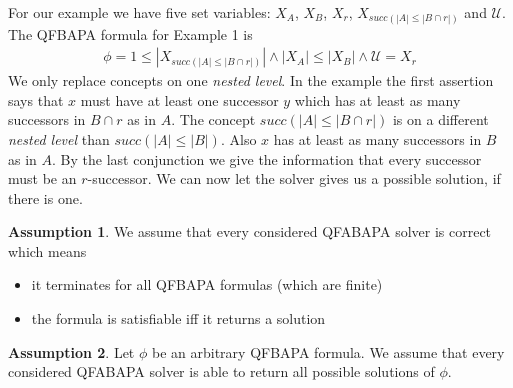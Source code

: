 \documentclass{book}
\theoremstyle{break}
\theoremstyle{definition}
\newtheorem{assumption}{Assumption}
\begin{document}
For our example we have five set variables: $X_A$, $X_B$, $X_r$, $X_{succ(|A|\leq |B\cap r|)}$ and $\mathcal{U}$. The QFBAPA formula for Example 1 is 
\begin{align}\label{f}
\phi=1\leq |X_{succ(|A|\leq |B\cap r|)}|\wedge |X_A|\leq |X_B|\wedge \mathcal{U}=X_r
\end{align}
We only replace concepts on one \textit{nested level}. In the example the first assertion says that $x$ must have at least one successor $y$ which has at least as many successors in $B\cap r$ as in $A$. The concept $succ(|A|\leq|B\cap r|)$ is on a different \textit{nested level} than $succ(|A|\leq |B|)$. Also $x$ has at least as many successors in $B$ as in $A$. By the last conjunction we give the information that every successor must be an $r$-successor. We can now let the solver gives us a possible solution, if there is one.
\begin{assumption}\label{assumption1}
We assume that every considered QFABAPA solver is correct which means
\begin{itemize}
\item it terminates for all QFBAPA formulas (which are finite)
\item the formula is satisfiable iff it returns a solution
\end{itemize}
\end{assumption}
\begin{assumption}\label{assumption2}
Let $\phi$ be an arbitrary QFBAPA formula. We assume that every considered QFABAPA solver is able to return all possible solutions of $\phi$.
\end{assumption}
\end{document}
